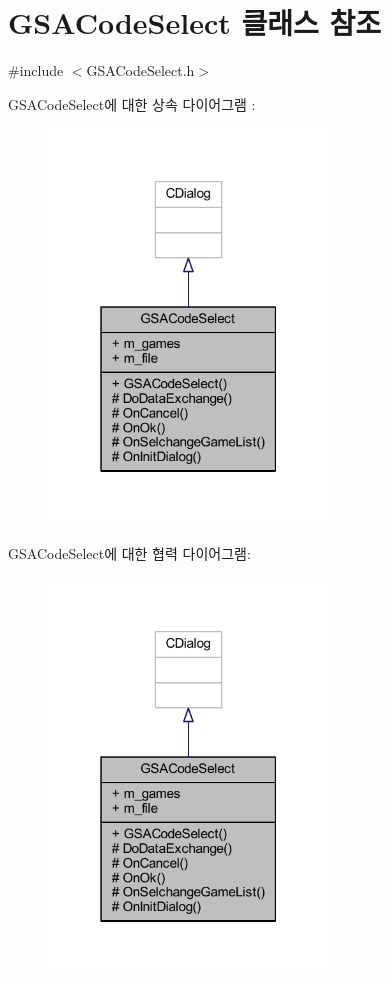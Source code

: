 \hypertarget{class_g_s_a_code_select}{}\section{G\+S\+A\+Code\+Select 클래스 참조}
\label{class_g_s_a_code_select}


{\ttfamily \#include $<$G\+S\+A\+Code\+Select.\+h$>$}



G\+S\+A\+Code\+Select에 대한 상속 다이어그램 \+: \nopagebreak
\begin{figure}[H]
\begin{center}
\leavevmode
\includegraphics[width=211pt]{class_g_s_a_code_select__inherit__graph}
\end{center}
\end{figure}


G\+S\+A\+Code\+Select에 대한 협력 다이어그램\+:\nopagebreak
\begin{figure}[H]
\begin{center}
\leavevmode
\includegraphics[width=211pt]{class_g_s_a_code_select__coll__graph}
\end{center}
\end{figure}
